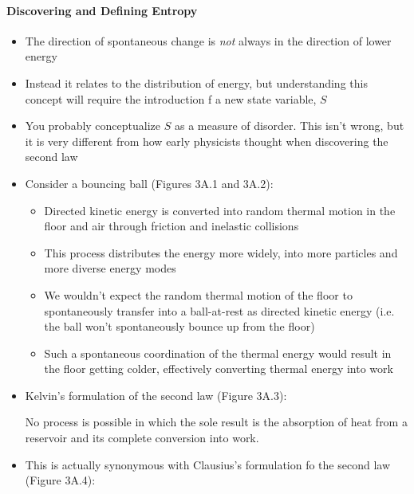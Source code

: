 \documentclass[12pt, openany, letterpaper]{memoir}
\begin{document}
\paragraph{Discovering and Defining Entropy}
\begin{itemize}
	\item The direction of spontaneous change is \emph{not} always in the direction of lower energy
	\item Instead it relates to the distribution of energy, but understanding this concept will require the introduction f a new state variable, $S$
	\item You probably conceptualize $S$ as a measure of disorder. This isn't wrong, but it is very different from how early physicists thought when discovering the second law
	\item Consider a bouncing ball (Figures 3A.1 and 3A.2):
	      \begin{itemize}
		      \item Directed kinetic energy is converted into random thermal motion in the floor and air through friction and inelastic collisions
		      \item This process distributes the energy more widely, into more particles and more diverse energy modes
		      \item We wouldn't expect the random thermal motion of the floor to spontaneously transfer into a ball-at-rest as directed kinetic energy (i.e. the ball won't spontaneously bounce up from the floor)
		      \item Such a spontaneous coordination of the thermal energy would result in the floor getting colder, effectively converting thermal energy into work
	      \end{itemize}
	\item Kelvin's formulation of the second law (Figure 3A.3):

	      No process is possible in which the sole result is the absorption of heat from a reservoir and its complete conversion into work.

	\item This is actually synonymous with Clausius's formulation fo the second law (Figure 3A.4):


\end{itemize}
\end{document}

